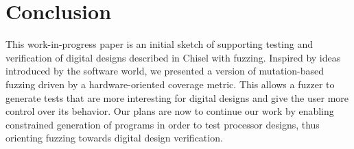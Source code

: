 \documentclass[conference]{IEEEtran}
\newcommand{\martin}[1]{{\color{blue} Martin: #1}}
\begin{document}
\section{Conclusion}
\label{sec:conclusion}

This work-in-progress paper is an initial sketch of supporting testing and verification
of digital designs described in Chisel with fuzzing. 
Inspired by ideas introduced by the software world, we presented a version of mutation-based fuzzing driven by a hardware-oriented coverage metric.
This allows a fuzzer to generate tests that are more interesting for digital designs and give the user more control over its behavior. 
Our plans are now to continue our work by enabling constrained generation of programs in order to test processor designs, thus orienting fuzzing towards digital design verification.
%
%



\end{document}
